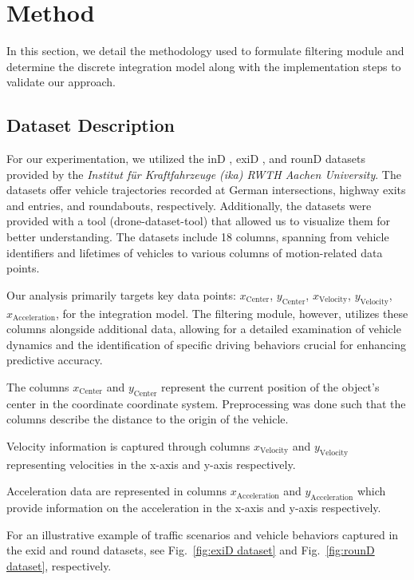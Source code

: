 \section{Method}

In this section, we detail the methodology used to formulate filtering module and determine the discrete integration model
along with the implementation steps to validate our approach.

\subsection{Dataset Description} \label{sec:dataset_descrition}
For our experimentation, we utilized the inD \cite{inDdataset}, exiD \cite{exiDdataset}, and rounD \cite{rounDdataset} datasets provided by the 
\textit{Institut für Kraftfahrzeuge (ika) RWTH Aachen University}.
The datasets offer vehicle trajectories recorded at German intersections, highway exits and entries, 
and roundabouts, respectively. 
Additionally, the datasets were provided with a tool (drone-dataset-tool) \cite{repo:drone-dataset-tool} that allowed us to visualize them for better understanding. 
The datasets include 18 columns, spanning from vehicle identifiers and lifetimes of vehicles to various columns of motion-related data points.

Our analysis primarily targets key data points: 
$x_{\text{Center}}$, $y_{\text{Center}}$, $x_{\text{Velocity}}$, $y_{\text{Velocity}}$, $x_{\text{Acceleration}}$, for the integration model. The filtering module, however, utilizes these columns alongside additional data, allowing for a detailed examination of vehicle dynamics and the identification of specific driving behaviors crucial for enhancing predictive accuracy.

The columns  $x_{\text{Center}}$ and $y_{\text{Center}}$ represent the current position of the object's center in the coordinate coordinate system. Preprocessing was done such that the columns describe the distance to the origin of the vehicle.

Velocity information is captured through columns $x_{\text{Velocity}}$ and $y_{\text{Velocity}}$ representing velocities 
in the x-axis and y-axis respectively.

Acceleration data are represented in columns $x_{\text{Acceleration}}$ and $y_{\text{Acceleration}}$ which provide 
information on the acceleration in the x-axis and y-axis respectively.

For an illustrative example of traffic scenarios and vehicle behaviors captured in the exid and round datasets, see Fig.~\ref{fig:exiD dataset} and Fig.~\ref{fig:rounD dataset}, respectively.

